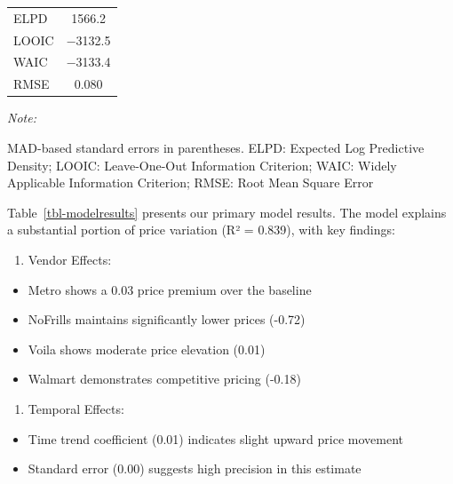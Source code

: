 \documentclass[
  letterpaper,
  DIV=11,
  numbers=noendperiod]{scrartcl}
\providecommand{\tightlist}{%
  \setlength{\itemsep}{0pt}\setlength{\parskip}{0pt}}\usepackage{longtable,booktabs,array}
\begin{document}
\begin{table}
{\begin{threeparttable}
\begin{tabular}[t]{lc}
ELPD & \num{1566.2}\\
LOOIC & \num{-3132.5}\\
WAIC & \num{-3133.4}\\
RMSE & \num{0.080}\\
\bottomrule
\end{tabular}
\begin{tablenotes}
\item \textit{Note: } 
\item MAD-based standard errors in parentheses. ELPD: Expected Log Predictive Density; LOOIC: Leave-One-Out Information Criterion; WAIC: Widely Applicable Information Criterion; RMSE: Root Mean Square Error
\end{tablenotes}
\end{threeparttable}

}

\end{table}%

Table~\ref{tbl-modelresults} presents our primary model results. The
model explains a substantial portion of price variation (R² = 0.839),
with key findings:

\begin{enumerate}
\def\labelenumi{\arabic{enumi}.}
\tightlist
\item
  Vendor Effects:
\end{enumerate}

\begin{itemize}
\item
  Metro shows a 0.03 price premium over the baseline
\item
  NoFrills maintains significantly lower prices (-0.72)
\item
  Voila shows moderate price elevation (0.01)
\item
  Walmart demonstrates competitive pricing (-0.18)
\end{itemize}

\begin{enumerate}
\def\labelenumi{\arabic{enumi}.}
\setcounter{enumi}{1}
\tightlist
\item
  Temporal Effects:
\end{enumerate}

\begin{itemize}
\item
  Time trend coefficient (0.01) indicates slight upward price movement
\item
  Standard error (0.00) suggests high precision in this estimate
\end{itemize}
\end{document}
